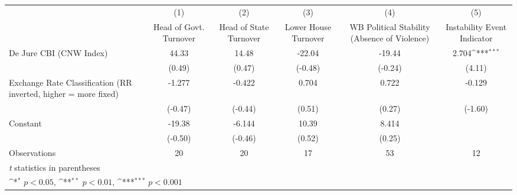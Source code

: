 {
\def\sym#1{\ifmmode^{#1}\else\(^{#1}\)\fi}
\begin{tabular*}{\linewidth}{@{\hskip\tabcolsep\extracolsep\fill}l*{5}{c}}
\toprule
                &\multicolumn{1}{c}{(1)}&\multicolumn{1}{c}{(2)}&\multicolumn{1}{c}{(3)}&\multicolumn{1}{c}{(4)}&\multicolumn{1}{c}{(5)}\\
                &\multicolumn{1}{c}{Head of Govt. Turnover}&\multicolumn{1}{c}{Head of State Turnover}&\multicolumn{1}{c}{Lower House Turnover}&\multicolumn{1}{c}{WB Political Stability (Absence of Violence)}&\multicolumn{1}{c}{Instability Event Indicator}\\
\midrule
De Jure CBI (CNW Index)&    44.33         &    14.48         &   -22.04         &   -19.44         &    2.704\sym{***}\\
                &   (0.49)         &   (0.47)         &  (-0.48)         &  (-0.24)         &   (4.11)         \\
\addlinespace
Exchange Rate Classification (RR inverted, higher = more fixed)&   -1.277         &   -0.422         &    0.704         &    0.722         &   -0.129         \\
                &  (-0.47)         &  (-0.44)         &   (0.51)         &   (0.27)         &  (-1.60)         \\
\addlinespace
Constant        &   -19.38         &   -6.144         &    10.39         &    8.414         &                  \\
                &  (-0.50)         &  (-0.46)         &   (0.52)         &   (0.25)         &                  \\
\midrule
Observations    &       20         &       20         &       17         &       53         &       12         \\
\bottomrule
\multicolumn{6}{l}{\footnotesize \textit{t} statistics in parentheses}\\
\multicolumn{6}{l}{\footnotesize \sym{*} \(p<0.05\), \sym{**} \(p<0.01\), \sym{***} \(p<0.001\)}\\
\end{tabular*}
}
